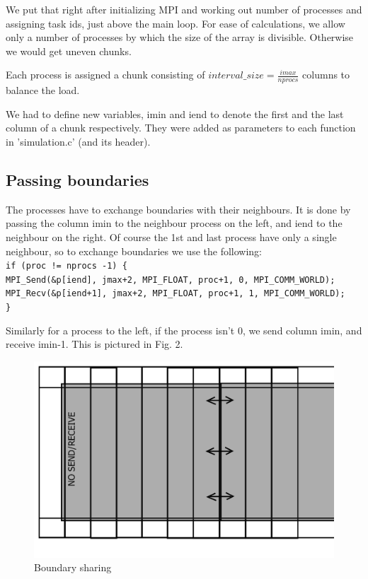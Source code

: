 \documentclass[11pt,journal]{article}
\newcommand\tab[1][1cm]{\hspace*{#1}}
\begin{document}
	We put that right after initializing MPI and working out number of processes and assigning task ids, just above the main loop. For ease of calculations, we allow only a number of processes by which the size of the array is divisible. Otherwise we would get uneven chunks.
	
	Each process is assigned a chunk consisting of $interval\_size = \frac{imax}{nprocs} $ columns to balance the load.
	
	We had to define new variables, imin and iend to denote the first and the last column of a chunk respectively. They were added as parameters to each function in 'simulation.c' (and its header).
	
	\subsection{Passing boundaries}
	The processes have to exchange boundaries with their neighbours. It is done by passing the column imin to the neighbour process on the left, and iend to the neighbour on the right. Of course the 1st and last process have only a single neighbour, so to exchange boundaries we use the following:
	\texttt{\\
	\tab if (proc != nprocs -1) \{  \\
	\tab \tab MPI\_Send(\&p[iend], jmax+2, MPI\_FLOAT, proc+1, 0, MPI\_COMM\_WORLD);\\
	\tab \tab MPI\_Recv(\&p[iend+1], jmax+2, MPI\_FLOAT, proc+1, 1, MPI\_COMM\_WORLD);\\
	\tab \}
	}

	Similarly for a process to the left, if the process isn't 0, we send column imin, and receive imin-1. This is pictured in Fig. 2.
	\begin{figure}[h]
		\centering
		\includegraphics[]{HPC_diag2.png}
		\caption{Boundary sharing}
	\end{figure}	
	
\end{document}
